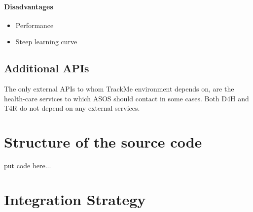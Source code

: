 \documentclass[a4paper, hidelinks, 12pt]{report}
\begin{document}
\subsubsection{Disadvantages}
\begin{itemize}
\item{} Performance
\item{} Steep learning curve

\end{itemize}

	






	\section{Additional APIs}
The only external APIs to whom TrackMe environment depends on, are the health-care services to which ASOS should contact in some cases. Both D4H and T4R do not depend on any external services.


\chapter{Structure of the source code}
put code here...		


	\chapter{Integration Strategy}
\end{document}
